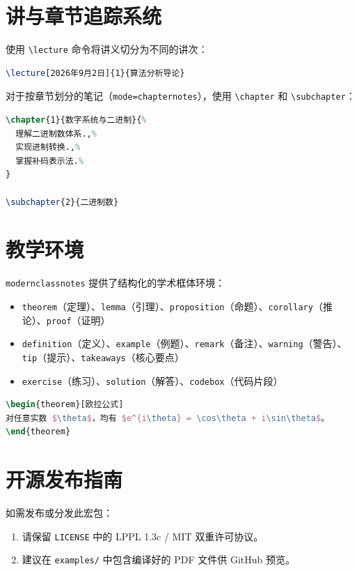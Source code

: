 \documentclass[mode=notes, palette=ocean, lang=chinese, fontsize=11pt]{modernclassnotes}
\begin{document}
\section{讲与章节追踪系统}

使用 \texttt{\textbackslash lecture} 命令将讲义切分为不同的讲次：
\begin{codebox}[讲次宏]
\begin{lstlisting}[language=TeX]
\lecture[2026年9月2日]{1}{算法分析导论}
\end{lstlisting}
\end{codebox}

对于按章节划分的笔记（\texttt{mode=chapternotes}），使用 \texttt{\textbackslash chapter} 和 \texttt{\textbackslash subchapter}：
\begin{codebox}[带教学目标的章节宏]
\begin{lstlisting}[language=TeX]
\chapter{1}{数字系统与二进制}{%
  理解二进制数体系.,%
  实现进制转换.,%
  掌握补码表示法.%
}

\subchapter{2}{二进制数}
\end{lstlisting}
\end{codebox}

\section{教学环境}

\begin{definition}[数学与教学框体环境]
\texttt{modernclassnotes} 提供了结构化的学术框体环境：
\begin{itemize}
    \item \texttt{theorem}（定理）、\texttt{lemma}（引理）、\texttt{proposition}（命题）、\texttt{corollary}（推论）、\texttt{proof}（证明）
    \item \texttt{definition}（定义）、\texttt{example}（例题）、\texttt{remark}（备注）、\texttt{warning}（警告）、\texttt{tip}（提示）、\texttt{takeaways}（核心要点）
    \item \texttt{exercise}（练习）、\texttt{solution}（解答）、\texttt{codebox}（代码片段）
\end{itemize}
\end{definition}

\begin{example}[定理环境示例]
\begin{lstlisting}[language=TeX]
\begin{theorem}[欧拉公式]
对任意实数 $\theta$，均有 $e^{i\theta} = \cos\theta + i\sin\theta$。
\end{theorem}
\end{lstlisting}
\end{example}

\section{开源发布指南}

如需发布或分发此宏包：
\begin{enumerate}
    \item 请保留 \texttt{LICENSE} 中的 LPPL 1.3c / MIT 双重许可协议。
    \item 建议在 \texttt{examples/} 中包含编译好的 PDF 文件供 GitHub 预览。
\end{enumerate}
\end{document}
